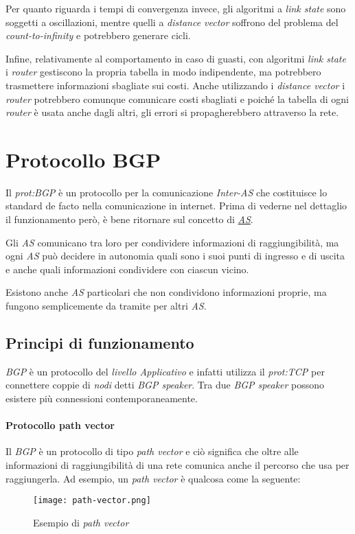 Per quanto riguarda i tempi di convergenza invece, gli algoritmi a \emph{link
state} sono soggetti a oscillazioni, mentre quelli a \emph{distance vector}
soffrono del problema del \emph{count-to-infinity} e potrebbero generare cicli.

Infine, relativamente al comportamento in caso di guasti, con algoritmi
\emph{link state} i \emph{router} gestiscono la propria tabella in modo
indipendente, ma potrebbero trasmettere informazioni sbagliate sui costi.
Anche utilizzando i \emph{distance vector} i \emph{router} potrebbero comunque
comunicare costi sbagliati e poiché la tabella di ogni \emph{router} è usata
anche dagli altri, gli errori si propagherebbero attraverso la rete.

\section{Protocollo BGP}
Il \emph{\gls{prot:BGP}} è un protocollo per la comunicazione \emph{Inter-AS} che
costituisce lo standard de facto nella comunicazione in internet.
Prima di vederne nel dettaglio il funzionamento però, è bene ritornare sul
concetto di \emph{\hyperref[def:17]{AS}}.

\bigskip\noindent
Gli \emph{AS} comunicano tra loro per condividere informazioni di raggiungibilità,
ma ogni \emph{AS} può decidere in autonomia quali sono i suoi punti di ingresso
e di uscita e anche quali informazioni condividere con ciascun vicino.

Esistono anche \emph{AS} particolari che non condividono informazioni proprie,
ma fungono semplicemente da tramite per altri \emph{AS}.

\subsection{Principi di funzionamento}
\emph{BGP} è un protocollo del \emph{livello Applicativo} e infatti utilizza il
\emph{\gls{prot:TCP}} per connettere coppie di \emph{nodi} detti \emph{BGP
speaker}. Tra due \emph{BGP speaker} possono esistere più connessioni
contemporaneamente.

\paragraph{Protocollo path vector}
Il \emph{BGP} è un protocollo di tipo \emph{path vector} e ciò significa che
oltre alle informazioni di raggiungibilità di una rete comunica anche il
percorso che usa per raggiungerla.
Ad esempio, un \emph{path vector} è qualcosa come la seguente:
\begin{figure}[h!]
    \centering
    \texttt{[image: path-vector.png]}
    \caption{Esempio di \emph{path vector}}
\end{figure}

